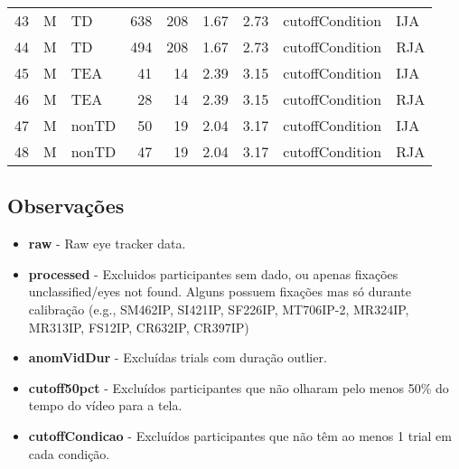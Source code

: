 \documentclass{article}
\begin{document}
\begin{table}[ht]
\begin{tabular}{rllrrrrll}
    43 & M & TD & 638 & 208 & 1.67 & 2.73 & cutoffCondition & IJA \\ 
    44 & M & TD & 494 & 208 & 1.67 & 2.73 & cutoffCondition & RJA \\ 
    45 & M & TEA &  41 &  14 & 2.39 & 3.15 & cutoffCondition & IJA \\ 
    46 & M & TEA &  28 &  14 & 2.39 & 3.15 & cutoffCondition & RJA \\ 
    47 & M & nonTD &  50 &  19 & 2.04 & 3.17 & cutoffCondition & IJA \\ 
    48 & M & nonTD &  47 &  19 & 2.04 & 3.17 & cutoffCondition & RJA \\ 
     \hline
  \end{tabular}
  \end{table}
  \subsection{Observações}

\begin{itemize}
  \item \textbf{raw} - Raw eye tracker data. 
  \item \textbf{processed} - Excluidos participantes sem dado, ou apenas fixações unclassified/eyes not found. Alguns possuem fixações mas só durante calibração (e.g., SM462IP, SI421IP, SF226IP, MT706IP-2, MR324IP, MR313IP, FS12IP, CR632IP, CR397IP)
  \item \textbf{anomVidDur} - Excluídas trials com duração outlier.
  \item \textbf{cutoff50pct} - Excluídos participantes que não olharam pelo menos 50\% do tempo do vídeo para a tela.
  \item \textbf{cutoffCondicao} - Excluídos participantes que não têm ao menos 1 trial em cada condição.
\end{itemize}
\end{document}
